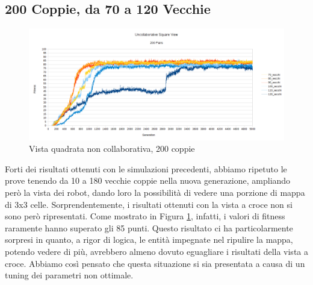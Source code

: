 \subsection{200 Coppie, da 70 a 120 Vecchie}
\begin{figure}[ht]
	\centering
	\includegraphics[scale=0.7,angle=90]{imgs/uncollaborative_square_200_pairs_70_120_vecchi.png}
	\caption{Vista quadrata non collaborativa, 200 coppie}
	\label{figure:uncoll_square_200_70_120_vecchi_non_mutati}
\end{figure}
Forti dei risultati ottenuti con le simulazioni precedenti, abbiamo ripetuto le
prove tenendo da 10 a 180 vecchie coppie nella nuova generazione, ampliando
però la vista dei robot, dando loro la possibilità di vedere una porzione di
mappa di 3x3 celle.\newline
Sorprendentemente, i risultati ottenuti con la vista a croce non si sono però
ripresentati. Come mostrato in Figura
\ref{figure:uncoll_square_200_70_120_vecchi_non_mutati}, infatti, i valori di
fitness raramente hanno superato gli 85 punti. Questo risultato ci ha
particolarmente sorpresi in quanto, a rigor di logica, le entità impegnate nel
ripulire la mappa, potendo vedere di più, avrebbero almeno dovuto eguagliare i
risultati della vista a croce. Abbiamo così pensato che questa situazione si sia
presentata a causa di un tuning dei parametri non ottimale.

